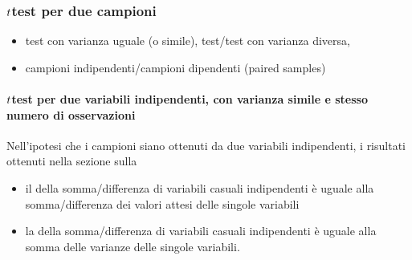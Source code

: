 \documentclass[letterpaper,10pt,italian]{jupyterBook}
\begin{document}
\subsubsection{\protect\(t\protect\)\sphinxhyphen{}test per due campioni}
\label{\detokenize{ch/statistics/t-test:t-test-per-due-campioni}}\begin{itemize}
\item {} 
\sphinxAtStartPar
test con varianza uguale (o simile), \sphinxhyphen{}test/test con varianza diversa, 

\item {} 
\sphinxAtStartPar
campioni indipendenti/campioni dipendenti (paired samples)

\end{itemize}


\paragraph{\protect\(t\protect\)\sphinxhyphen{}test per due variabili indipendenti, con varianza simile e stesso numero di osservazioni}
\label{\detokenize{ch/statistics/t-test:t-test-per-due-variabili-indipendenti-con-varianza-simile-e-stesso-numero-di-osservazioni}}
\sphinxAtStartPar
Nell’ipotesi che i campioni siano ottenuti da due variabili indipendenti, i risultati ottenuti nella sezione sulla {\hyperref[\detokenize{ch/statistics::doc}]{}}
\begin{itemize}
\item {} 
\sphinxAtStartPar
il  della somma/differenza di variabili casuali indipendenti è uguale alla somma/differenza dei valori attesi delle singole variabili

\item {} 
\sphinxAtStartPar
la  della somma/differenza di variabili casuali indipendenti è uguale alla somma delle varianze delle singole variabili.

\end{itemize}
\end{document}
